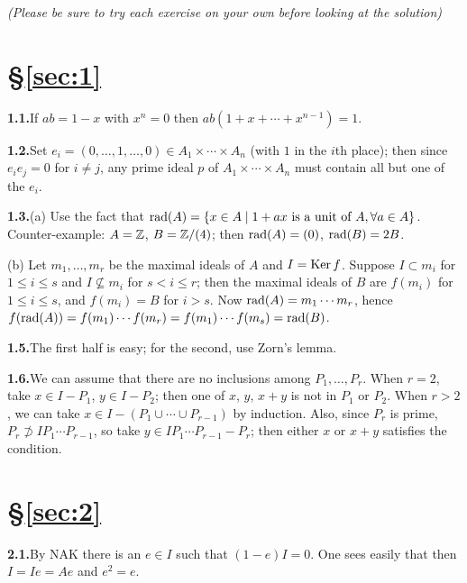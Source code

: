 
\noindent\textit{(Please be sure to try each exercise on your own before looking at
the solution)}

\section*{\S\ref{sec:1}}

\noindent\textbf{1.1.}\quad If $ab = 1 - x$ with $x^n = 0$ then $ab(1 + x + \cdots + x^{n-1}) = 1$.

\noindent\textbf{1.2.}\quad Set $e_i = (0, \ldots, 1, \ldots, 0) \in A_1 \times \cdots \times A_n$ (with $1$ in the $i$th place); then since
$e_ie_j = 0$ for $i \neq j$, any prime ideal $p$ of $A_1 \times \cdots \times A_n$ must contain all but one
of the $e_i$.

\noindent\textbf{1.3.}\quad (a) Use the fact that $\operatorname{rad}(A) = \{x \in A \mid 1 + ax \text{ is a unit of } A, \forall a \in A\}$.
Counter-example: $A = \mathbb{Z}$, $B = \mathbb{Z}/(4)$; then $\operatorname{rad}(A) = (0)$, $\operatorname{rad}(B) = 2B$.

\smallskip
\noindent\hspace*{1.5em}(b) Let $m_1, \ldots, m_r$ be the maximal ideals of $A$ and $I = \operatorname{Ker} f$. Suppose
$I \subset m_i$ for $1 \le i \le s$ and $I \nsubseteq m_i$ for $s < i \le r$; then the maximal ideals of $B$
are $f(m_i)$ for $1 \le i \le s$, and $f(m_i) = B$ for $i > s$. Now $\operatorname{rad}(A) = m_1 \cdots m_r$,
hence $f(\operatorname{rad}(A)) = f(m_1) \cdots f(m_r) = f(m_1) \cdots f(m_s) = \operatorname{rad}(B)$.

\noindent\textbf{1.5.}\quad The first half is easy; for the second, use Zorn's lemma.

\noindent\textbf{1.6.}\quad We can assume that there are no inclusions among $P_1, \ldots, P_r$. When $r = 2$,
take $x \in I - P_1$, $y \in I - P_2$; then one of $x$, $y$, $x + y$ is not in $P_1$ or $P_2$. When
$r > 2$, we can take $x \in I - (P_1 \cup \cdots \cup P_{r-1})$ by induction. Also, since $P_r$ is
prime, $P_r \not\supset IP_1 \cdots P_{r-1}$, so take $y \in IP_1 \cdots P_{r-1} - P_r$; then either $x$ or $x + y$
satisfies the condition.

\section*{\S\ref{sec:2}}

\noindent\textbf{2.1.}\quad By NAK there is an $e \in I$ such that $(1 - e)I = 0$. One sees easily that then
$I = Ie = Ae$ and $e^2 = e$.

